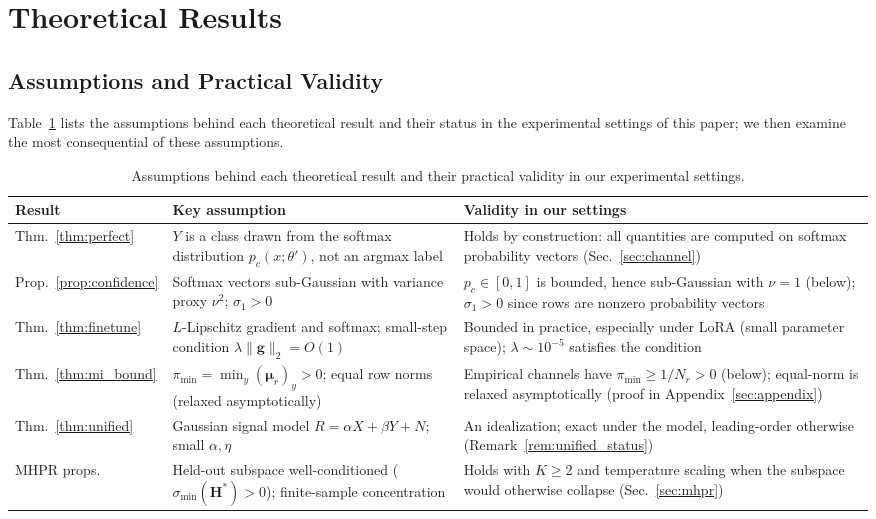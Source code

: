 \documentclass[smallextended]{svjour3}       %
\begin{document}
\section{Theoretical Results}
\label{sec:theory}

\subsection{Assumptions and Practical Validity}
\label{sec:assumptions}

Table~\ref{tab:assumptions} lists the assumptions behind each theoretical result and their status in the experimental settings of this paper; we then examine the most consequential of these assumptions.

\begin{table}[t]
\centering
\footnotesize
\caption{Assumptions behind each theoretical result and their practical validity in our experimental settings.}\label{tab:assumptions}
\setlength{\tabcolsep}{2pt}
\begin{tabular}{p{2.0cm} p{4.9cm} p{4.8cm}}
\toprule
Result & Key assumption & Validity in our settings \\
\midrule
Thm.~\ref{thm:perfect} & $Y$ is a class drawn from the softmax distribution $p_c(x;\theta')$, not an argmax label & Holds by construction: all quantities are computed on softmax probability vectors (Sec.~\ref{sec:channel}) \\
Prop.~\ref{prop:confidence} & Softmax vectors sub-Gaussian with variance proxy $\nu^2$; $\sigma_1>0$ & $p_c\in[0,1]$ is bounded, hence sub-Gaussian with $\nu=1$ (below); $\sigma_1>0$ since rows are nonzero probability vectors \\
Thm.~\ref{thm:finetune} & $L$-Lipschitz gradient and softmax; small-step condition $\lambda\|\mathbf{g}\|_2=O(1)$ & Bounded in practice, especially under LoRA (small parameter space); $\lambda{\sim}10^{-5}$ satisfies the condition \\
Thm.~\ref{thm:mi_bound} & $\pi_{\min}=\min_y(\boldsymbol{\mu}_r)_y>0$; equal row norms (relaxed asymptotically) & Empirical channels have $\pi_{\min}\ge 1/N_r>0$ (below); equal-norm is relaxed asymptotically (proof in Appendix~\ref{sec:appendix}) \\
Thm.~\ref{thm:unified} & Gaussian signal model $R=\alpha X+\beta Y+N$; small $\alpha,\eta$ & An idealization; exact under the model, leading-order otherwise (Remark~\ref{rem:unified_status}) \\
MHPR props. & Held-out subspace well-conditioned ($\sigma_{\min}(\mathbf{H}^*)>0$); finite-sample concentration & Holds with $K\ge2$ and temperature scaling when the subspace would otherwise collapse (Sec.~\ref{sec:mhpr}) \\
\bottomrule
\end{tabular}
\end{table}
\end{document}
